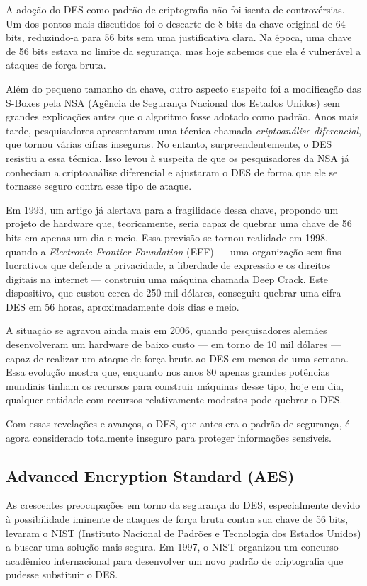 A adoção do DES como padrão de criptografia não foi isenta de controvérsias.
Um dos pontos mais discutidos foi o descarte de 8 bits da chave original de 64 bits, reduzindo-a para 56 bits sem uma justificativa clara.
Na época, uma chave de 56 bits estava no limite da segurança, mas hoje sabemos que ela é vulnerável a ataques de força bruta.

Além do pequeno tamanho da chave, outro aspecto suspeito foi a modificação das S-Boxes pela NSA (Agência de Segurança Nacional dos Estados Unidos) sem grandes explicações antes que o algoritmo fosse adotado como padrão.
Anos mais tarde, pesquisadores apresentaram uma técnica chamada {\em criptoanálise diferencial}, que tornou várias cifras inseguras.
No entanto, surpreendentemente, o DES resistiu a essa técnica.
Isso levou à suspeita de que os pesquisadores da NSA já conheciam a criptoanálise diferencial e ajustaram o DES de forma que ele se tornasse seguro contra esse tipo de ataque.

Em 1993, um artigo já alertava para a fragilidade dessa chave, propondo um projeto de hardware que, teoricamente, seria capaz de quebrar uma chave de 56 bits em apenas um dia e meio.
Essa previsão se tornou realidade em 1998, quando a {\em Electronic Frontier Foundation} (EFF)  — uma organização sem fins lucrativos que defende a privacidade, a liberdade de expressão e os direitos digitais na internet — construiu uma máquina chamada Deep Crack.
Este dispositivo, que custou cerca de 250 mil dólares, conseguiu quebrar uma cifra DES em 56 horas, aproximadamente dois dias e meio.

A situação se agravou ainda mais em 2006, quando pesquisadores alemães desenvolveram um hardware de baixo custo — em torno de 10 mil dólares — capaz de realizar um ataque de força bruta ao DES em menos de uma semana.
Essa evolução mostra que, enquanto nos anos 80 apenas grandes potências mundiais tinham os recursos para construir máquinas desse tipo, hoje em dia, qualquer entidade com recursos relativamente modestos pode quebrar o DES.

Com essas revelações e avanços, o DES, que antes era o padrão de segurança, é agora considerado totalmente inseguro para proteger informações sensíveis.

\subsection{Advanced Encryption Standard (AES)}
\label{sec:aes}

As crescentes preocupações em torno da segurança do DES, especialmente devido à possibilidade iminente de ataques de força bruta contra sua chave de 56 bits, levaram o NIST (Instituto Nacional de Padrões e Tecnologia dos Estados Unidos) a buscar uma solução mais segura.
Em 1997, o NIST organizou um concurso acadêmico internacional para desenvolver um novo padrão de criptografia que pudesse substituir o DES.

